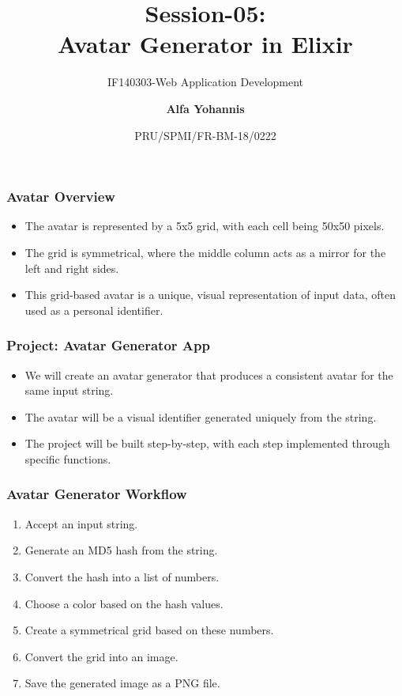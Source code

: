\documentclass[aspectratio=169, table]{beamer}
\subtitle{IF140303-Web Application Development}
\title{\LARGE{Session-05:\\ Avatar Generator in Elixir}
	\vspace{20pt}}
\date[Serial]{\scriptsize {PRU/SPMI/FR-BM-18/0222}}
\author[Pradita]{\small{\textbf{Alfa Yohannis}}}
\begin{document}
	
	\frame{\titlepage}
	
	\begin{frame}
		\frametitle{Avatar Overview}
		\begin{itemize}
			\item The avatar is represented by a 5x5 grid, with each cell being 50x50 pixels.
			\item The grid is symmetrical, where the middle column acts as a mirror for the left and right sides.
			\item This grid-based avatar is a unique, visual representation of input data, often used as a personal identifier.
		\end{itemize}
	\end{frame}
	
	\begin{frame}
		\frametitle{Project: Avatar Generator App}
		\begin{itemize}
			\item We will create an avatar generator that produces a consistent avatar for the same input string.
			\item The avatar will be a visual identifier generated uniquely from the string.
			\item The project will be built step-by-step, with each step implemented through specific functions.
		\end{itemize}
	\end{frame}
	
	\begin{frame}
		\frametitle{Avatar Generator Workflow}
		\begin{enumerate}
			\item Accept an input string.
			\item Generate an MD5 hash from the string.
			\item Convert the hash into a list of numbers.
			\item Choose a color based on the hash values.
			\item Create a symmetrical grid based on these numbers.
			\item Convert the grid into an image.
			\item Save the generated image as a PNG file.
		\end{enumerate}
	\end{frame}
	
\end{document}
